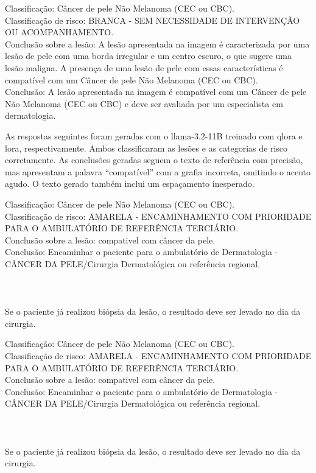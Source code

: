 \begin{dialogue}
     Classificação: Câncer de pele Não Melanoma (CEC ou CBC). \\
    Classificação de risco: BRANCA - SEM NECESSIDADE DE INTERVENÇÃO OU ACOMPANHAMENTO. \\
    Conclusão sobre a lesão: A lesão apresentada na imagem é caracterizada por uma lesão de pele com uma borda
    irregular e um centro escuro, o que sugere uma lesão maligna. A presença de uma lesão de pele com essas
    características
    é compatível com um Câncer de pele Não Melanoma (CEC ou CBC). \\
    Conclusão: A lesão apresentada na imagem é compatível com um Câncer de pele Não Melanoma (CEC ou CBC) e deve ser
    avaliada por um especialista em dermatologia.
\end{dialogue}

As respostas seguintes foram geradas com o \ac{llama}-3.2-11B treinado com \ac{qlora} e \ac{lora}, respectivamente.
Ambos classificaram as lesões e as categorias de risco corretamente. As conclusões geradas seguem o texto de referência
com precisão, mas apresentam a palavra ``compatível'' com a grafia incorreta, omitindo o acento agudo. O texto gerado
também inclui um espaçamento inesperado.

\begin{dialogue}
     Classificação: Câncer de pele Não Melanoma (CEC ou CBC). \\
    Classificação de risco: AMARELA - ENCAMINHAMENTO COM PRIORIDADE PARA O AMBULATÓRIO DE REFERÊNCIA TERCIÁRIO. \\
    Conclusão sobre a lesão: compativel com câncer da pele. \\
    Conclusão: Encaminhar o paciente para o ambulatório de Dermatologia - CÂNCER DA PELE/Cirurgia Dermatológica ou
    referência regional. \\ \\ \\ \\
    Se o paciente já realizou biópsia da lesão, o resultado deve ser levado no dia da cirurgia.
\end{dialogue}

\begin{dialogue}
     Classificação: Câncer de pele Não Melanoma (CEC ou CBC). \\
    Classificação de risco: AMARELA - ENCAMINHAMENTO COM PRIORIDADE PARA O AMBULATÓRIO DE REFERÊNCIA TERCIÁRIO. \\
    Conclusão sobre a lesão: compativel com câncer da pele. \\
    Conclusão: Encaminhar o paciente para o ambulatório de Dermatologia - CÂNCER DA PELE/Cirurgia Dermatológica ou
    referência regional. \\ \\ \\ \\
    Se o paciente já realizou biópsia da lesão, o resultado deve ser levado no dia da cirurgia.
\end{dialogue}

